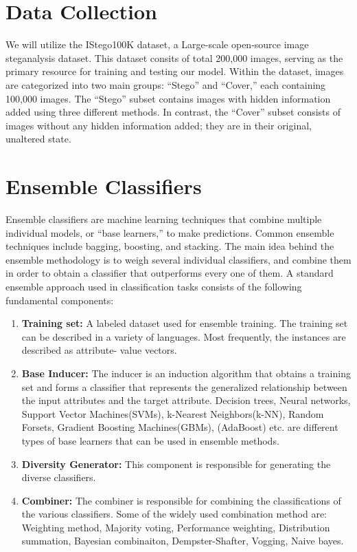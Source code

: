 \section{Data Collection} 
We will utilize the IStego100K dataset\cite{7}, a Large-scale open-source image \mbox{steganalysis} dataset. This dataset consits of total 200,000 images, serving as the primary resource for training and testing our model. Within the dataset, images are categorized into two main groups: ``Stego'' and ``Cover,'' each containing 100,000 \mbox{images}. The ``Stego'' subset contains images with hidden information added using three \mbox{different} methods. In contrast, the ``Cover'' subset consists of images without any hidden \mbox{information} added; they are in their original, unaltered state.

\section{Ensemble Classifiers}
Ensemble classifiers are machine learning techniques that combine multiple individual models, or ``base learners,'' to make predictions. Common ensemble techniques include bagging, boosting, and stacking. The main idea behind the ensemble methodology is to weigh several individual classifiers, and combine them in order to obtain a classifier that outperforms every one of them. A standard ensemble approach used in classification tasks consists of the following fundamental components:
\begin{enumerate}
    \item \textbf{Training set:} A labeled dataset used for ensemble training. The training set can be
    described in a variety of languages. Most frequently, the instances are described as attribute-
    value vectors.
    \item \textbf{Base Inducer:} The inducer is an induction algorithm that obtains a training set and
    forms a classifier that represents the generalized relationship between the input attributes
    and the target attribute. Decision trees, Neural networks, Support Vector Machines(SVMs), k-Nearest Neighbors(k-NN), Random Forsets, Gradient Boosting Machines(GBMs), (AdaBoost) etc. are different types of base learners that can be used in ensemble methods.
    \item \textbf{Diversity Generator:} This component is responsible for generating the diverse
    classifiers.
    \item \textbf{Combiner:} The combiner is responsible for combining the classifications of the various
    classifiers. Some of the widely used combination method are: Weighting method, Majority voting, Performance weighting, Distribution summation, Bayesian combinaiton, Dempster-Shafter, Vogging, Naive bayes.\cite{21} 
\end{enumerate}
